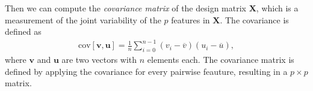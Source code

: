 \noindent Then we can compute the \textit{covariance matrix} of the design matrix $\boldsymbol{X}$, which is a measurement of the joint variability of the $p$ features in $\boldsymbol{X}$. The covariance is defined as
\begin{align}
\mathrm{cov}[\boldsymbol{v},\boldsymbol{u}] =\frac{1}{n} \sum_{i=0}^{n-1}(v_i- \overline{v})(u_i- \overline{u}),
\end{align}
where $\boldsymbol{v}$ and $\boldsymbol{u}$ are two vectors with $n$ elements each. The covariance matrix is defined by applying the covariance for every pairwise feauture, resulting in a $p\times p$ matrix. \begin{comment}On the diagonal, the covariance of two equal features becomes the variance of one,
\begin{align}
  \mathrm{cov}[\boldsymbol{u},\boldsymbol{u}] &=\frac{1}{n} \sum_{i=0}^{n-1}(u_i- \overline{u})(u_i- \overline{u}) = \mathrm{var}[\boldsymbol{u}].
\end{align}
The covariance can take values between $\pm \infty$, which give rise to computational issues due to loss of numerical precision. Therefore, we scale the covariance matrix by the variance. This is known as the correlation function
\begin{align}
  \mathrm{corr}[\boldsymbol{u},\boldsymbol{v}]=\frac{\mathrm{cov}[\boldsymbol{u},\boldsymbol{v}]}{\sqrt{\mathrm{var}[\boldsymbol{u}] \mathrm{var}[\boldsymbol{v}]}}.
\end{align}
Since all values are between $-1$ and $1$, we avoid any loss of numerical precision. The resulting covariance matrix $\boldsymbol{C} \in {\mathbb{R}}^{p\times p}$ becomes


\end{comment}
